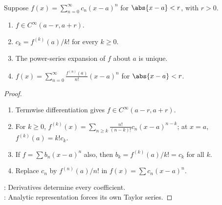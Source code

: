 \begin{corollary} \label{cor:analytic-functions-smooth-and-unique-taylor} \\
Suppose $f(x)=\sum\limits_{n=0}^{\infty}c_n(x-a)^n$ for $\abs{x-a}<r$, with $r>0$.
\begin{enumerate}[label=(\roman*)]
\setlength{\itemsep}{0pt}
\item $f\in C^\infty(a-r,a+r)$.
\item $c_k=f^{(k)}(a)/k!$ for every $k\geq0$.
\item The power-series expansion of $f$ about $a$ is unique.
\item $f(x)=\sum\limits_{n=0}^{\infty}\frac{f^{(n)}(a)}{n!}(x-a)^n$ for $\abs{x-a}<r$.
\end{enumerate}
\begin{proof}
\begin{enumerate}[label=(\roman*)]
\setlength{\itemsep}{0pt}
\item Termwise differentiation gives $f\in C^\infty(a-r,a+r)$.
\item For $k\geq0$, $f^{(k)}(x)=\sum\limits_{n\geq k}\frac{n!}{(n-k)!}c_n(x-a)^{n-k}$; at $x=a$, $f^{(k)}(a)=k!c_k$.
\item If $f=\sum b_n(x-a)^n$ also, then $b_k=f^{(k)}(a)/k!=c_k$ for all $k$.
\item Replace $c_n$ by $f^{(n)}(a)/n!$ in $f(x)=\sum c_n(x-a)^n$.
\end{enumerate}
: Derivatives determine every coefficient.\\
: Analytic representation forces its own Taylor series.
\end{proof}
\end{corollary}

